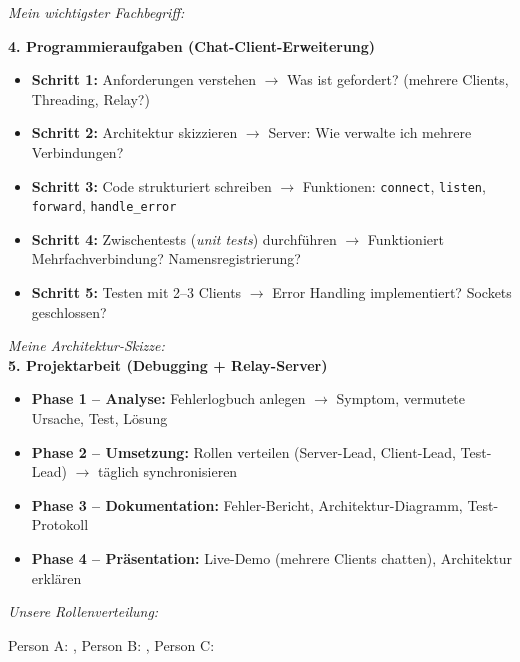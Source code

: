 \begin{mainBox}[title=Methodische Anleitung zur Durchführung der Prüfungsaufgaben]
    \textit{Mein wichtigster Fachbegriff:} \underline{\hspace{8cm}}

    \textbf{\large 4. Programmieraufgaben (Chat-Client-Erweiterung)}
    \begin{itemize}[topsep=2pt, itemsep=2pt]
        \item \textbf{Schritt 1:} Anforderungen verstehen $\rightarrow$ Was ist gefordert? (mehrere Clients, Threading, Relay?)
        \item \textbf{Schritt 2:} Architektur skizzieren $\rightarrow$ Server: Wie verwalte ich mehrere Verbindungen?
        \item \textbf{Schritt 3:} Code strukturiert schreiben $\rightarrow$ Funktionen: \texttt{connect}, \texttt{listen}, \texttt{forward}, \texttt{handle\_error}
        \item \textbf{Schritt 4:} Zwischentests (\textit{unit tests}) durchführen $\rightarrow$ Funktioniert Mehrfachverbindung? Namensregistrierung?
        \item \textbf{Schritt 5:} Testen mit 2--3 Clients $\rightarrow$ Error Handling implementiert? Sockets geschlossen?
    \end{itemize}

    \textit{Meine Architektur-Skizze:} \\
    \vspace{5cm}
    \newpage
    \textbf{\large 5. Projektarbeit (Debugging + Relay-Server)}
    \begin{itemize}[topsep=2pt, itemsep=2pt]
        \item \textbf{Phase 1 -- Analyse:} Fehlerlogbuch anlegen $\rightarrow$ Symptom, vermutete Ursache, Test, Lösung
        \item \textbf{Phase 2 -- Umsetzung:} Rollen verteilen (Server-Lead, Client-Lead, Test-Lead) $\rightarrow$ täglich synchronisieren
        \item \textbf{Phase 3 -- Dokumentation:} Fehler-Bericht, Architektur-Diagramm, Test-Protokoll
        \item \textbf{Phase 4 -- Präsentation:} Live-Demo (mehrere Clients chatten), Architektur erklären
    \end{itemize}

    \textit{Unsere Rollenverteilung:} 
    
    Person A: \underline{\hspace{2.5cm}}, Person B: \underline{\hspace{2.5cm}}, Person C: \underline{\hspace{2.5cm}}


\end{mainBox}
